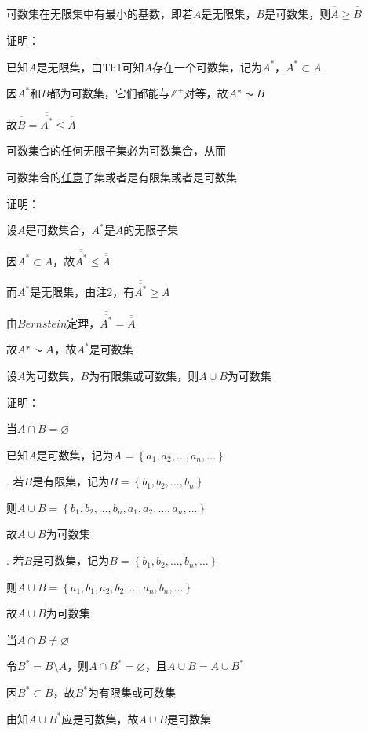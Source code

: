 \begin{wa}
可数集在无限集中有最小的基数，即若$A$是无限集，$B$是可数集，则$\overline{\overline{A}} \geqslant \overline{\overline{B}}$    
\end{wa}
\noindent 证明：
\par 已知$A$是无限集，由Th1可知$A$存在一个可数集，记为$A^{*}$，$A^{*}\subset A$
\par 因$A^{*}$和$B$都为可数集，它们都能与$\mathbb{Z}^{+}$对等，故$A^{*}\thicksim B$
\par 故$\overline{\overline{B}} = \overline{\overline{A^{*}}} \leqslant \overline{\overline{A}}$

\begin{td}
可数集合的任何\uline{无限}子集必为可数集合，从而
\par \quad \quad \quad \quad 可数集合的\uline{任意}子集或者是有限集或者是可数集    
\end{td}
\noindent 证明：
\par 设$A$是可数集合，$A^{*}$是$A$的无限子集
\par 因$A^{*}\subset A$，故$\overline{\overline{A^{*}}} \leqslant \overline{\overline{A}}$
\par 而$A^{*}$是无限集，由注2，有$\overline{\overline{A^{*}}} \geqslant \overline{\overline{A}}$
\par 由$Bernstein$定理，$\overline{\overline{A^{*}}} = \overline{\overline{A}}$
\par 故$A^{*}\thicksim A$，故$A^{*}$是可数集

\begin{td}
设$A$为可数集，$B$为有限集或可数集，则$A \cup B$为可数集    
\end{td}
\noindent 证明：
\par {}当$A \cap B = \varnothing $
\par 已知$A$是可数集，记为$A = \left\{a_{1},a_{2},\dots,a_{n},\dots\right\} $
\par {}. 若$B$是有限集，记为$B = \left\{b_{1},b_{2},\dots,b_{n}\right\} $
\par \quad 则$A \cup B = \left\{b_{1},b_{2},\dots,b_{n},a_{1},a_{2},\dots,a_{n},\dots\right\} $
\par \quad 故$A \cup B$为可数集
\par {}. 若$B$是可数集，记为$B = \left\{b_{1},b_{2},\dots,b_{n},\dots\right\} $
\par \quad 则$A \cup B = \left\{a_{1},b_{1},a_{2},b_{2},\dots,a_{n},b_{n},\dots\right\} $
\par \quad 故$A \cup B$为可数集
\par {}当$A \cap B \neq \varnothing $
\par 令$B^{*} = B \setminus A$，则$A \cap B^{*} = \varnothing$，且$A \cup B = A \cup B^{*}$
\par 因$B^{*} \subset B$，故$B^{*}$为有限集或可数集
\par 由知$A \cup B^{*}$应是可数集，故$A \cup B$是可数集

